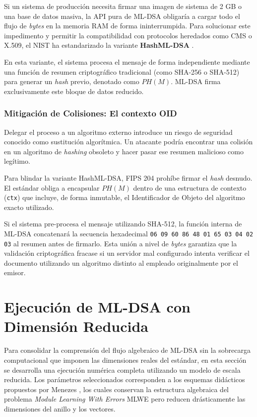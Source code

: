 \documentclass[11pt, a4paper]{report}
\theoremstyle{definition}
\begin{document}
Si un sistema de producción necesita firmar una imagen de sistema de 2 GB o una base de datos masiva, la API pura de ML-DSA obligaría a cargar todo el flujo de \textit{bytes} en la memoria RAM de forma ininterrumpida. Para solucionar este impedimento y permitir la compatibilidad con protocolos heredados como CMS o X.509, el NIST ha estandarizado la variante \textbf{HashML-DSA} \cite{ietf_mldsa_pki}.

En esta variante, el sistema procesa el mensaje de forma independiente mediante una función de resumen criptográfico tradicional (como SHA-256 o SHA-512) para generar un \textit{hash} previo, denotado como $PH(M)$. ML-DSA firma exclusivamente este bloque de datos reducido.

\subsubsection{Mitigación de Colisiones: El contexto OID}

Delegar el proceso a un algoritmo externo introduce un riesgo de seguridad conocido como sustitución algorítmica. Un atacante podría encontrar una colisión en un algoritmo de \textit{hashing} obsoleto y hacer pasar ese resumen malicioso como legítimo.

Para blindar la variante HashML-DSA, FIPS 204 prohíbe firmar el \textit{hash} desnudo. El estándar obliga a encapsular $PH(M)$ dentro de una estructura de contexto (\texttt{ctx}) que incluye, de forma inmutable, el Identificador de Objeto del algoritmo exacto utilizado.

Si el sistema pre-procesa el mensaje utilizando SHA-512, la función interna de ML-DSA concatenará la secuencia hexadecimal \texttt{06 09 60 86 48 01 65 03 04 02 03} al resumen antes de firmarlo. Esta unión a nivel de \textit{bytes} garantiza que la validación criptográfica fracase si un servidor mal configurado intenta verificar el documento utilizando un algoritmo distinto al empleado originalmente por el emisor.

\section{Ejecución de ML-DSA con Dimensión Reducida}
\label{sec:instanciacion_juguete}

Para consolidar la comprensión del flujo algebraico de ML-DSA sin la sobrecarga computacional que imponen las dimensiones reales del estándar, en esta sección se desarrolla una ejecución numérica completa utilizando un modelo de escala reducida. Los parámetros seleccionados corresponden a los esquemas didácticos propuestos por Menezes \cite{menezes_slides}, los cuales conservan la estructura algebraica del problema \textit{Module Learning With Errors} MLWE pero reducen drásticamente las dimensiones del anillo y los vectores.
\end{document}
